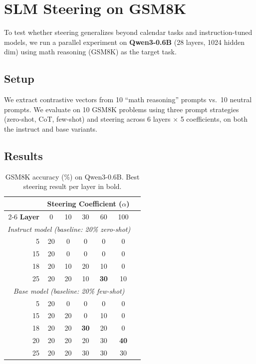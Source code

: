 \documentclass[11pt,a4paper]{article}
\begin{document}
\section{SLM Steering on GSM8K}
\label{sec:gsm8k}

To test whether steering generalizes beyond calendar tasks and instruction-tuned models, we run a parallel experiment on \textbf{Qwen3-0.6B} (28 layers, 1024 hidden dim) using math reasoning (GSM8K) as the target task.

\subsection{Setup}
We extract contrastive vectors from 10 ``math reasoning'' prompts vs.\ 10 neutral prompts. We evaluate on 10 GSM8K problems using three prompt strategies (zero-shot, CoT, few-shot) and steering across 6 layers $\times$ 5 coefficients, on both the instruct and base variants.

\subsection{Results}

\begin{table}[H]
\centering
\caption{GSM8K accuracy (\%) on Qwen3-0.6B. Best steering result per layer in bold.}
\label{tab:gsm8k}
\small
\begin{tabular}{rcccccc}
\toprule
& \multicolumn{5}{c}{\textbf{Steering Coefficient ($\alpha$)}} \\
\cmidrule(lr){2-6}
\textbf{Layer} & 0 & 10 & 30 & 60 & 100 \\
\midrule
\multicolumn{6}{c}{\textit{Instruct model (baseline: 20\% zero-shot)}} \\
\midrule
5  & 20 & 0 & 0 & 0 & 0 \\
15 & 20 & 0 & 0 & 0 & 0 \\
18 & 20 & 10 & 20 & 10 & 0 \\
25 & 20 & 20 & 10 & \textbf{30} & 10 \\
\midrule
\multicolumn{6}{c}{\textit{Base model (baseline: 20\% few-shot)}} \\
\midrule
5  & 20 & 0 & 0 & 0 & 0 \\
15 & 20 & 20 & 0 & 10 & 0 \\
18 & 20 & 20 & \textbf{30} & 20 & 0 \\
20 & 20 & 20 & 20 & 30 & \textbf{40} \\
25 & 20 & 20 & 30 & 30 & 30 \\
\bottomrule
\end{tabular}
\end{table}
\end{document}

